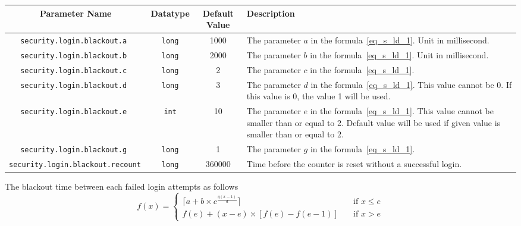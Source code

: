 \documentclass[a4paper,12pt]{report}
\begin{document}
	\begin{tabularx}{\textwidth}{c||c|c|X}
		Parameter Name & Datatype & Default Value & Description\\\hline
		\texttt{security.login.blackout.a }&\texttt{long}& 1000 & The parameter $a$ in the formula~\ref{eq_s_ld_1}. Unit in millisecond.\\
		\texttt{security.login.blackout.b }&\texttt{long}& 2000 &The parameter $b$ in the formula~\ref{eq_s_ld_1}. Unit in millisecond.\\
		\texttt{security.login.blackout.c }&\texttt{long}& 2 &The parameter $c$ in the formula~\ref{eq_s_ld_1}.\\
		\texttt{security.login.blackout.d }&\texttt{long}& 3 &The parameter $d$ in the formula~\ref{eq_s_ld_1}. This value cannot be 0. If this value is 0, the value 1
		will be used.\\
		\texttt{security.login.blackout.e }&\texttt{int}& 10 &The parameter $e$ in the formula~\ref{eq_s_ld_1}. This value cannot be smaller than  or equal to  2. Default value will be used if given value is smaller than or equal to  2.\\
		\texttt{security.login.blackout.g }&\texttt{long}& 1 &The parameter $g$ in the formula~\ref{eq_s_ld_1}. \\
		\texttt{security.login.blackout.recount }&\texttt{long}& 360000&Time before the counter is reset without a successful login. 
	\end{tabularx}
	
	\medskip
	
	The blackout time between each failed login attempts as follows\label{eq_s_ld_1}
	\begin{equation}
	f(x) = \begin{cases}
	\lceil a + b \times c ^ {\frac{g(x-1)}{d}}\rceil        & \quad \text{if } x \leqslant e\\
	f(e) + (x-e)\times[f(e) - f(e-1)]  & \quad \text{if } x > e
	\end{cases}
	\end{equation}
	
	
\end{document}
